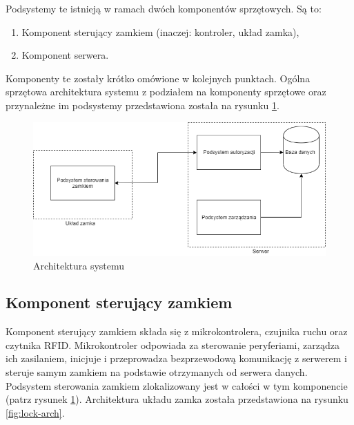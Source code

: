                 Podsystemy te istnieją w ramach dwóch komponentów sprzętowych. Są to:
                \begin{enumerate}
                        \item Komponent sterujący zamkiem (inaczej: kontroler, układ zamka),
                        \item Komponent serwera.
                \end{enumerate}

                Komponenty te zostały krótko omówione w kolejnych punktach. Ogólna sprzętowa architektura systemu z podziałem na komponenty sprzętowe oraz przynależne im podsystemy przedstawiona została na rysunku \ref{fig:hl-arch}.

                \begin{figure}[]
                        \includegraphics[width=\linewidth]{chapters/images/hl-arch3.png}
                        \caption{Architektura systemu}
                        \label{fig:hl-arch}
                \end{figure}

                \subsection{Komponent sterujący zamkiem}
                        Komponent sterujący zamkiem składa się z mikrokontrolera, czujnika ruchu oraz czytnika RFID. Mikrokontroler odpowiada za sterowanie peryferiami, zarządza ich zasilaniem, inicjuje i przeprowadza bezprzewodową komunikację z serwerem i steruje samym zamkiem na podstawie otrzymanych od serwera danych. Podsystem sterowania zamkiem zlokalizowany jest w całości w tym komponencie (patrz rysunek \ref{fig:hl-arch}). Architektura układu zamka została przedstawiona na rysunku \ref{fig:lock-arch}. 

